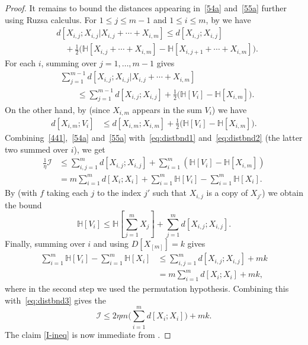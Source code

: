 \documentclass[10pt,a4paper]{article}
\newcommand{\bbH}{\mathbb{H}}
\begin{document}
\begin{proof}
It remains to bound the distances appearing in~\eqref{54a} and~\eqref{55a} further using Ruzsa calculus.
For $1 \leq j \leq m-1$ and $1 \leq i \leq m$, by  we have
\begin{align*} &d[ X_{i,j}; X_{i,j}| X_{i,j}+\cdots+X_{i,m}]
\leq d[X_{i,j}; X_{i,j}] \\
&\quad + \tfrac{1}{2} \bigl(\bbH[X_{i,j}+\cdots+X_{i,m}] - \bbH[X_{i,{j+1}}+\cdots+X_{i,m}]\bigr).
\end{align*}
For each $i$, summing over $j = 1,\dots, m-1$ gives
\begin{align}
  \nonumber
  &\sum_{j=1}^{m-1} d[X_{i,j}; X_{i,j}| X_{i,j}+\cdots+X_{i,m}] \\
  &\qquad \leq \sum_{j=1}^{m-1} d[X_{i,j}; X_{i,j}] + \frac12 \bigl( \bbH[V_i] - \bbH[X_{i,m}] \bigr).
  \label{eq:distbnd1}
\end{align}
On the other hand, by  (since $X_{i,m}$ appears in the sum $V_i$) we have
\begin{align}
  d[X_{i,m}; V_i]
  &\leq d[X_{i,m}; X_{i,m}] + \frac12 \bigl( \bbH[V_i] - \bbH[X_{i,m}] \bigr).
  \label{eq:distbnd2}
\end{align}
Combining~\eqref{441},~\eqref{54a} and~\eqref{55a} with~\eqref{eq:distbnd1} and~\eqref{eq:distbnd2} (the latter two summed over $i$), we get
\begin{align}
  \nonumber
  \frac1{\eta} {\mathcal I} &\leq \sum_{i,j=1}^m d[X_{i,j};X_{i,j}] + \sum_{i=1}^m (\bbH[V_i] - \bbH[X_{i,m}]) \\
      &= m \sum_{i=1}^m d[X_i; X_i] + \sum_{i=1}^m \bbH[V_i] - \sum_{i=1}^m \bbH[X_i].
      \label{eq:distbnd3}
\end{align}
By  (with $f$ taking each $j$ to the index $j'$ such that $X_{i,j}$ is a copy of $X_{j'}$) we obtain the bound
\[
  \bbH[V_i] \leq \bbH[\sum_{j=1}^m X_j] + \sum_{j=1}^m d[X_{i,j}; X_{i,j}].
\]
Finally, summing over $i$ and using $D[X_{[m]}] = k$ gives
\begin{align*}
  \sum_{i=1}^m \bbH[V_i] - \sum_{i=1}^m \bbH[X_i] & \leq \sum_{i,j=1}^m d[X_{i,j}; X_{i,j}] + m k \\ & = m\sum_{i = 1}^m d[X_i; X_i] + mk,
\end{align*}
where in the second step we used the permutation hypothesis. Combining this with~\eqref{eq:distbnd3} gives the
$$
{\mathcal I} \leq 2\eta m \biggl( \sum_{i=1}^m d[X_i;X_i] \biggr) + mk.$$
The claim \eqref{I-ineq} is now immediate from .
\end{proof}
\end{document}
